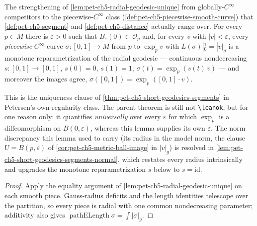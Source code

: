 \begin{lemma}
  \label{lem:pet-ch5-radial-geodesic-unique-piecewise}
  \leanok
  The strengthening of \cref{lem:pet-ch5-radial-geodesic-unique} from
  globally-$C^\infty$ competitors to the piecewise-$C^\infty$ class
  (\cref{def:pet-ch5-piecewise-smooth-curve}) that
  \cref{def:pet-ch5-segment} and \cref{def:pet-ch5-distance} actually range over.
  For every
  $p\in M$ there is $\varepsilon>0$ such that $B_\varepsilon(0)\subset\mathcal
  O_p$ and, for every $v$ with $|v|<\varepsilon$, every \emph{piecewise}-$C^\infty$
  curve $\sigma:[0,1]\to M$ from $p$ to $\exp_p v$ with
  $L(\sigma)|_0^1=|v|_g$ is a monotone reparametrization of the radial geodesic —
  continuous nondecreasing $s:[0,1]\to[0,1]$, $s(0)=0$, $s(1)=1$,
  $\sigma(t)=\exp_p(s(t)\,v)$ — and moreover the images agree,
  $\sigma([0,1])=\exp_p([0,1]\cdot v)$.

  This is the uniqueness clause of \cref{thm:pet-ch5-short-geodesics-segments} in
  Petersen's own regularity class. The parent theorem is still not
  \texttt{\textbackslash leanok}, but for one reason only: it quantifies
  \emph{universally} over every $\varepsilon$ for which $\exp_p$ is a
  diffeomorphism on $B(0,\varepsilon)$, whereas this lemma supplies its own
  $\varepsilon$.  The norm discrepancy this lemma used to carry (its radius in the
  model norm, the clause $U=B(p,\varepsilon)$ of
  \cref{cor:pet-ch5-metric-ball-image} in $|v|_g$) is resolved in
  \cref{lem:pet-ch5-short-geodesics-segments-normal}, which restates every radius
  intrinsically and upgrades the monotone reparametrization $s$ below to
  $s=\mathrm{id}$.
\end{lemma}
\begin{proof}
  \leanok
  \sketch
  Apply the equality argument of \cref{lem:pet-ch5-radial-geodesic-unique} on
  each smooth piece.  Gauss-radius deficits and the length identities telescope
  over the partition, so every piece is radial with one common nondecreasing
  parameter; additivity also gives
  $\operatorname{pathELength}\sigma=\int|\dot\sigma|_g$.
\end{proof}

